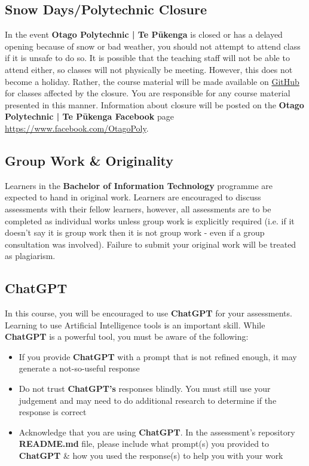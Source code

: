 \documentclass{article}
\begin{document}
\subsection*{Snow Days/Polytechnic Closure}
In the event \textbf{Otago Polytechnic | Te Pūkenga} is closed or has a delayed opening because of snow or bad weather, you should not attempt to attend class if it is unsafe to do so. It is possible that the teaching staff will not be able to attend either, so classes will not physically be meeting. However, this does not become a holiday. Rather, the course material will be made available on \href{https://github.com/otago-polytechnic-bit-courses/ID511001-programming-2}{GitHub} for classes affected by the closure. You are responsible for any course material presented in this manner. Information about closure will be posted on the \textbf{Otago Polytechnic | Te Pūkenga Facebook} page \href{https://www.facebook.com/OtagoPoly}{https://www.facebook.com/OtagoPoly}.

\subsection*{Group Work \& Originality}
Learners in the \textbf{Bachelor of Information Technology} programme are expected to hand in original work. Learners are encouraged to discuss assessments with their fellow learners, however, all assessments are to be completed as individual works unless group work is explicitly required (i.e. if it doesn't say it is group work then it is not group work - even if a group consultation was involved). Failure to submit your original work will be treated as plagiarism.

\subsection*{ChatGPT}
In this course, you will be encouraged to use \textbf{ChatGPT} for your assessments. Learning to use Artificial Intelligence tools is an important skill. While \textbf{ChatGPT} is a powerful tool, you must be aware of the following:

\begin{itemize}
    \item If you provide \textbf{ChatGPT} with a prompt that is not refined enough, it may generate a not-so-useful response
    \item Do not trust \textbf{ChatGPT's} responses blindly. You must still use your judgement and may need to do additional research to determine if the response is correct
    \item Acknowledge that you are using \textbf{ChatGPT}. In the assessment's repository \textbf{README.md} file, please include what prompt(s) you provided to \textbf{ChatGPT} \& how you used the response(s) to help you with your work
\end{itemize}
\end{document}
